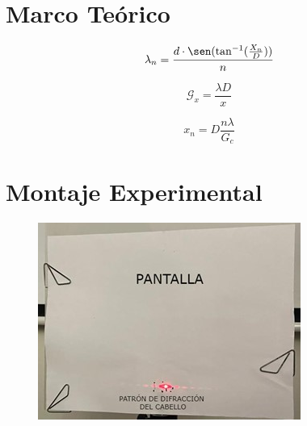 \documentclass[twocolumn, 12pt]{article}
\begin{document}
\section{Marco Teórico}

 {\Large
  \begin{equation}
        \lambda_{n} = \frac{d \cdot \sen ( \tan^{-1} (\frac{X_{n}}{D}))}{n}
        \label{eq:lambda-n}
  \end{equation}
 }

 {\Large
  \begin{equation}
        \mathcal{G}_x = \frac{\lambda D}{x}
        \label{eq:grosor-cabello}
  \end{equation}
 }

 {\Large
  \begin{equation}
        x_{n} = D \frac{n \lambda}{G_{c}}
        \label{eq:x_n}
  \end{equation}
 }

\section{Montaje Experimental}

\begin{figure}[H]
      \begin{center}
            \includegraphics[width=.9\linewidth]{./Images/1.jpg}
            \caption{}
      \end{center}
\end{figure}

\vspace{-.5cm}
\end{document}
